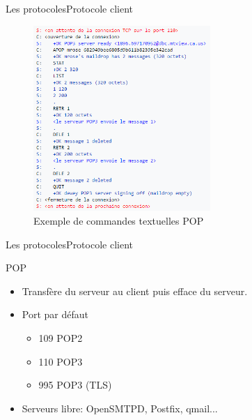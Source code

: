 \documentclass{beamer}
\begin{document}
\begin{frame}{Les protocoles}{Protocole client}
\begin{example}
    \begin{figure}[H]
    \centering
    \includegraphics[width=0.6\textwidth]{pop_message}
     \caption{Exemple de commandes textuelles POP}
     \label{fig:commande_text_POP}
    \end{figure}
\end{example}
\end{frame}

\begin{frame}{Les protocoles}{Protocole client}
  \begin{block}{POP}
  \begin{itemize}
  \item<1->{
  Transfère du serveur au client puis efface du serveur.
  }
    \item<2->{
    Port par défaut \\
    \begin{itemize}
        \item 109 POP2
        \item 110 POP3
        \item 995 POP3 (TLS)
    \end{itemize}
    }
    \item<3->{
     Serveurs libre: OpenSMTPD, Postfix, qmail...
    }
  \end{itemize}
  \end{block}
\end{frame}
\end{document}
